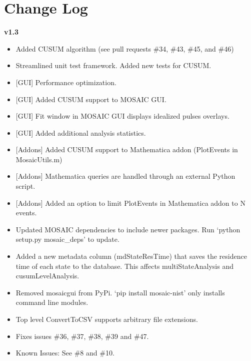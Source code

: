 \documentclass[letterpaper,10pt,english]{sphinxmanual}
\begin{document}
\chapter{Change Log}
\label{doc/ChangeLog:changelog-page}\label{doc/ChangeLog::doc}\label{doc/ChangeLog:change-log}
\textbf{v1.3}
\begin{itemize}
\item {} 
Added CUSUM algorithm (see pull requests \#34, \#43, \#45, and \#46)

\item {} 
Streamlined unit test framework. Added new tests for CUSUM.

\item {} 
{[}GUI{]} Performance optimization.

\item {} 
{[}GUI{]} Added CUSUM support to MOSAIC GUI.

\item {} 
{[}GUI{]} Fit window in MOSAIC GUI displays idealized pulses overlays.

\item {} 
{[}GUI{]} Added additional analysis statistics.

\item {} 
{[}Addons{]} Added CUSUM support to Mathematica addon (PlotEvents in MosaicUtils.m)

\item {} 
{[}Addons{]} Mathematica queries are handled through an external Python script.

\item {} 
{[}Addons{]} Added an option to limit PlotEvents in Mathematica addon to N events.

\item {} 
Updated MOSAIC dependencies to include newer packages. Run `python setup.py mosaic\_deps' to update.

\item {} 
Added a new metadata column (mdStateResTime) that saves the residence time of each state to the database. This affects multiStateAnalysis and cusumLevelAnalysis.

\item {} 
Removed mosaicgui from PyPi. `pip install mosaic-nist' only installs command line modules.

\item {} 
Top level ConvertToCSV supports arbitrary file extensions.

\item {} 
Fixes issues \#36, \#37, \#38, \#39 and \#47.

\item {} 
Known Issues: See \#8 and \#10.

\end{itemize}
\end{document}
